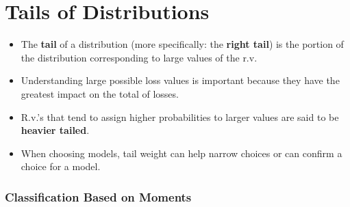 \documentclass[]{book}
\begin{document}
\section{Tails of Distributions}\label{tails-of-distributions}

\begin{itemize}
\item
  The \textbf{tail} of a distribution (more specifically: the
  \textbf{right tail}) is the portion of the distribution corresponding
  to large values of the r.v.
\item
  Understanding large possible loss values is important because they
  have the greatest impact on the total of losses.
\item
  R.v.'s that tend to assign higher probabilities to larger values are
  said to be \textbf{heavier tailed}.
\item
  When choosing models, tail weight can help narrow choices or can
  confirm a choice for a model.
\end{itemize}

\subsubsection{Classification Based on
Moments}\label{classification-based-on-moments}
\end{document}
